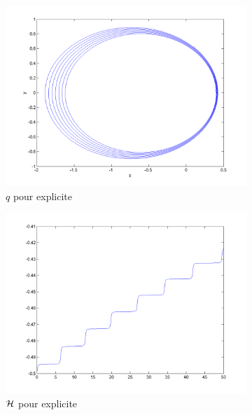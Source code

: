 \begin{figure}[!ht]
  \centering
  \begin{subfigure}[b]{0.45\textwidth}
    \includegraphics[width=\textwidth]{images/Q1_explicite_q.png}
    \caption{$q$ pour explicite}
    \label{fig:q1_explicite_q}
  \end{subfigure}%
  \begin{subfigure}[b]{0.45\textwidth}
    \includegraphics[width=\textwidth]{images/Q1_explicite_H.png}
    \caption{$\mathcal{H}$ pour explicite}
    \label{fig:q1_explicite_H}
  \end{subfigure}
  \begin{subfigure}[b]{0.45\textwidth}

\end{subfigure}
\end{figure}
